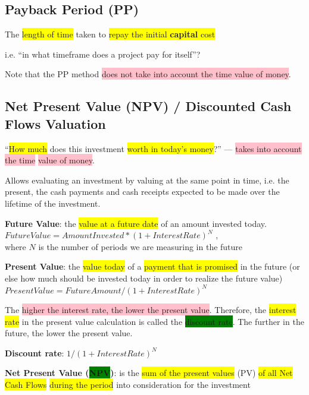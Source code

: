 \documentclass[]{project_plan}
\begin{document}
\subsection{Payback Period (PP)}
The \colorbox{yellow}{length of time} taken to \colorbox{yellow}{repay the initial \textbf{capital} cost}

i.e. “in what timeframe does a project pay for itself”?

Note that the PP method \colorbox{pink}{does not take into account the time value of money}.

\subsection{Net Present Value (NPV) / Discounted Cash Flows Valuation}

“\colorbox{yellow}{How much} does this investment \colorbox{yellow}{worth in today’s money}?”
— \colorbox{pink}{takes into account the time} \colorbox{pink}{value of money}.

Allows evaluating an investment by valuing at the same point in time, i.e. the present, the cash payments and
cash receipts expected to be made over the lifetime of the investment.

\textbf{Future Value}: the \colorbox{yellow}{value at a future date} of an amount invested today.\\
$Future Value = AmountInvested * (1 + InterestRate)^N$ ,\\ where $N$ is the number of periods we are measuring in the future

\textbf{Present Value}: the \colorbox{yellow}{value today} of a \colorbox{yellow}{payment that is promised} in the future (or else how much should be
invested today in order to realize the future value)\\
$Present Value = FutureAmount / (1 + InterestRate)^N$

The \colorbox{pink}{higher the interest rate, the lower the present value}. Therefore, the \colorbox{yellow}{interest rate} in the present value
calculation is called the \colorbox{green}{discount rate}. The further in the future, the lower the present value.

\textbf{Discount rate}: $1 / (1 + InterestRate)^N$

\textbf{Net Present Value (\colorbox{green}{NPV})}: is the \colorbox{yellow}{sum of the present values} (PV) \colorbox{yellow}{of all Net Cash Flows} \colorbox{yellow}{during the
  period} into consideration for the investment
\end{document}
